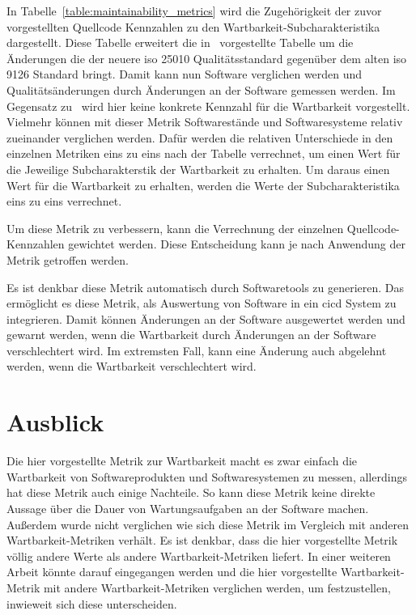 \documentclass[12pt, a4paper, ngerman]{article}
\begin{document}
In Tabelle~\ref{table:maintainability_metrics} wird die Zugehörigkeit
der zuvor vorgestellten Quellcode Kennzahlen zu den
Wartbarkeit-Subcharakteristika dargestellt.
Diese Tabelle erweitert die in~\cite{maintainability_metrics}
vorgestellte Tabelle um die Änderungen die der neuere \ac{iso} 25010 Qualitätsstandard
gegenüber dem alten \ac{iso} 9126 Standard bringt.
Damit kann nun Software verglichen werden und Qualitätsänderungen
durch Änderungen an der Software gemessen werden.
Im Gegensatz zu~\cite{maintainability_metrics}
wird hier keine konkrete Kennzahl für die Wartbarkeit vorgestellt.
Vielmehr können mit dieser Metrik Softwarestände und Softwaresysteme relativ zueinander verglichen werden.
Dafür werden die relativen Unterschiede in den einzelnen Metriken eins zu eins nach der Tabelle verrechnet,
um einen Wert für die Jeweilige Subcharakterstik der Wartbarkeit zu erhalten.
Um daraus einen Wert für die Wartbarkeit zu erhalten,
werden die Werte der Subcharakteristika eins zu eins verrechnet.

Um diese Metrik zu verbessern,
kann die Verrechnung der einzelnen Quellcode-Kennzahlen
gewichtet werden.
Diese Entscheidung kann je nach Anwendung der Metrik getroffen werden.

Es ist denkbar diese Metrik automatisch durch
Softwaretools zu generieren.
Das ermöglicht es diese Metrik, als Auswertung von Software
in ein \ac{cicd} System zu integrieren.
Damit können Änderungen an der Software ausgewertet werden
und gewarnt werden, wenn die Wartbarkeit durch Änderungen an der Software verschlechtert wird.
Im extremsten Fall, kann eine Änderung auch abgelehnt werden, wenn die Wartbarkeit verschlechtert wird.

\section{Ausblick}

Die hier vorgestellte Metrik zur Wartbarkeit macht es zwar einfach
die Wartbarkeit von Softwareprodukten und Softwaresystemen
zu messen, allerdings hat diese Metrik auch einige Nachteile.
So kann diese Metrik keine direkte Aussage über die Dauer 
von Wartungsaufgaben an der Software machen.
Außerdem wurde nicht verglichen wie sich diese Metrik 
im Vergleich mit anderen Wartbarkeit-Metriken verhält.
Es ist denkbar, dass die hier vorgestellte Metrik
völlig andere Werte als andere Wartbarkeit-Metriken liefert.
In einer weiteren Arbeit könnte darauf eingegangen werden
und die hier vorgestellte Wartbarkeit-Metrik
mit andere Wartbarkeit-Metriken verglichen werden,
um festzustellen, inwieweit sich diese unterscheiden.
\end{document}
